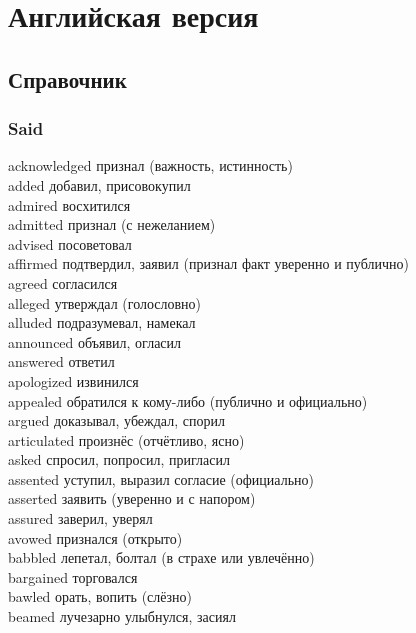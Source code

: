 \section{Английская версия}

\subsection{Справочник}

\subsubsection{Said}

acknowledged \hfill признал (важность, истинность)\\
added \hfill добавил, присовокупил\\
admired \hfill восхитился\\
admitted \hfill признал (с нежеланием)\\
advised \hfill посоветовал\\
affirmed \hfill подтвердил, заявил (признал факт уверенно и публично)\\
agreed \hfill согласился\\
alleged \hfill утверждал (голословно)\\
alluded \hfill подразумевал, намекал\\
announced \hfill объявил, огласил\\
answered \hfill ответил\\
apologized \hfill извинился\\
appealed \hfill обратился к кому-либо (публично и официально)\\
argued \hfill доказывал, убеждал, спорил\\
articulated \hfill произнёс (отчётливо, ясно)\\
asked \hfill спросил, попросил, пригласил\\
assented \hfill уступил, выразил согласие (официально)\\
asserted \hfill заявить (уверенно и с напором)\\
assured \hfill заверил, уверял\\
avowed \hfill признался (открыто)\\
babbled \hfill лепетал, болтал (в страхе или увлечённо)\\
bargained \hfill торговался\\
bawled \hfill орать, вопить (слёзно)\\
beamed \hfill лучезарно улыбнулся, засиял\\
